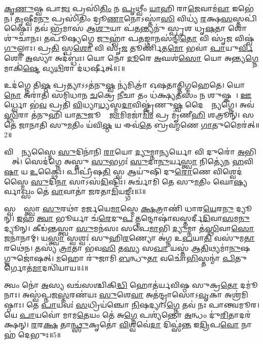 \ul{𑌕𑍃}\ul{𑌣𑍁}𑌷𑍍𑌵 𑌪𑌾\ul{𑌜𑌃} 𑌪𑍍𑌰𑌸𑌿॑\ul{𑌤𑌿𑌂} 𑌨 \ul{𑌪𑍃}𑌥𑍍𑌵𑍀𑌂 \ul{𑌯𑌾}𑌹𑌿 𑌰𑌾\ul{𑌜𑍇}𑌵𑌾𑌮॑\ul{𑌵𑌾}\ul{} 𑌇𑌭𑍇॑𑌨। \ul{𑌤𑍃}𑌷𑍍𑌵𑍀𑌮\ul{𑌨𑍁} 𑌪𑍍𑌰𑌸𑌿॑𑌤𑌿𑌂 𑌦𑍍𑌰𑍂\ul{𑌣𑌾}𑌨𑍋𑌽𑌸𑍍𑌤𑌾॑\ul{𑌸𑌿} 𑌵𑌿𑌧𑍍𑌯॑ \ul{𑌰}𑌕𑍍𑌷\ul{𑌸}𑌸𑍍𑌤𑌪𑌿॑𑌷𑍍𑌠𑍈𑌃। 𑌤𑌵॑ \ul{𑌭𑍍𑌰}𑌮𑌾𑌸॑ 𑌆\ul{𑌶𑍁}𑌯𑌾 𑌪॑\ul{𑌤}𑌨𑍍𑌤𑍍𑌯𑌨𑍁॑ 𑌸𑍍𑌪𑍃𑌶 𑌧𑍃\ul{𑌷}𑌤𑌾 𑌶𑍋𑌶𑍁॑𑌚𑌾𑌨𑌃। 𑌤𑌪𑍂॑𑌷𑍍𑌯𑌗𑍍𑌨𑍇 \ul{𑌜𑍁}𑌹𑍍𑌵𑌾॑ 𑌪\ul{𑌤}𑌙𑍍𑌗𑌾𑌨𑌸॑𑌨𑍍𑌦𑌿\ul{𑌤𑍋} 𑌵𑌿 𑌸𑍃॑\ul{𑌜} 𑌵𑌿𑌷𑍍𑌵॑\ul{𑌗𑍁}𑌲𑍍𑌕𑌾𑌃। 𑌪𑍍𑌰\ul{𑌤𑌿} 𑌸𑍍𑌪\ul{𑌶𑍋} 𑌵𑌿 𑌸𑍃॑\ul{𑌜} 𑌤𑍂𑌰𑍍𑌣𑌿॑𑌤\ul{𑌮𑍋} 𑌭𑌵𑌾॑ \ul{𑌪𑌾}𑌯𑍁\ul{𑌰𑍍𑌵𑌿}𑌶𑍋 \ul{𑌅}𑌸𑍍𑌯𑌾 𑌅𑌦॑𑌬𑍍𑌧𑌃। 𑌯𑍋 𑌨𑍋॑ \ul{𑌦𑍂}𑌰𑍇 \ul{𑌅}𑌘𑌶॑\ul{𑌸𑍋}  𑌯𑍋 𑌅𑌨𑍍𑌤𑍍𑌯\ul{𑌗𑍍𑌨𑍇} 𑌮𑌾𑌕𑌿॑\ul{𑌷𑍍𑌟𑍇} 𑌵𑍍𑌯\ul{𑌥𑌿}𑌰𑌾 𑌦॑𑌧𑌰𑍍𑌷𑍀𑌤𑍍॥1॥

𑌉𑌦॑𑌗𑍍𑌨𑍇 𑌤𑌿\ul{𑌷𑍍𑌠} 𑌪𑍍𑌰𑌤𑍍𑌯𑌾𑌽𑌽𑌤॑𑌨𑍁\ul{𑌷𑍍𑌵} 𑌨𑍍𑌯॑𑌮𑌿𑌤𑍍𑌰𑌾॑ 𑌓𑌷𑌤𑌾𑌤𑍍𑌤𑌿𑌗𑍍𑌮𑌹𑍇𑌤𑍇। 𑌯𑍋 \ul{𑌨𑍋} 𑌅𑌰𑌾॑𑌤𑌿 𑌸𑌮𑌿𑌧𑌾𑌨 \ul{𑌚}𑌕𑍍𑌰𑍇 \ul{𑌨𑍀}𑌚𑌾 𑌤𑌂 𑌧॑𑌕𑍍𑌷𑍍𑌯\ul{𑌤}𑌸𑌂 𑌨 𑌶𑍁𑌷𑍍𑌕𑌮𑍍᳚। \ul{𑌊}𑌰𑍍𑌧𑍍𑌵𑍋 𑌭॑\ul{𑌵} 𑌪𑍍𑌰𑌤𑌿॑ \ul{𑌵𑌿}𑌧𑍍𑌯𑌾\ul{𑌧𑍍𑌯}𑌸𑍍𑌮\ul{𑌦𑌾}𑌵𑌿𑌷𑍍𑌕𑍃॑𑌣𑍁\ul{𑌷𑍍𑌵} 𑌦𑍈𑌵𑍍𑌯𑌾᳚𑌨𑍍𑌯𑌗𑍍𑌨𑍇। 𑌅𑌵॑ \ul{𑌸𑍍𑌥𑌿}𑌰𑌾 𑌤॑𑌨𑍁𑌹𑌿 𑌯𑌾\ul{𑌤𑍁}𑌜𑍂𑌨𑌾𑌂᳚ \ul{𑌜𑌾}𑌮𑌿𑌮𑌜𑌾॑\ul{𑌮𑌿𑌂} 𑌪𑍍𑌰 𑌮𑍃॑𑌣𑍀\ul{𑌹𑌿} 𑌶𑌤𑍍𑌰𑍂𑌨𑍍॑। 𑌸 𑌤𑍇॑ 𑌜𑌾𑌨𑌾𑌤𑌿 𑌸𑍁\ul{𑌮}𑌤𑌿𑌂 𑌯॑𑌵𑌿\ul{𑌷𑍍𑌠} 𑌯 𑌈𑌵॑\ul{𑌤𑍇} 𑌬𑍍𑌰𑌹𑍍𑌮॑𑌣𑍇 \ul{𑌗𑌾}𑌤𑍁𑌮𑍈𑌰॑𑌤𑍍॥2॥

 𑌵𑌿𑌶𑍍𑌵𑌾᳚𑌨𑍍𑌯𑌸𑍍𑌮𑍈 \ul{𑌸𑍁}𑌦𑌿𑌨𑌾॑𑌨𑌿 \ul{𑌰𑌾}𑌯𑍋 \ul{𑌦𑍍𑌯𑍁}𑌮𑍍𑌨𑌾\ul{𑌨𑍍𑌯}𑌰𑍍𑌯𑍋 𑌵𑌿 𑌦𑍁𑌰𑍋॑ \ul{𑌅}𑌭𑌿 𑌦𑍍𑌯𑍗᳚𑌤𑍍। 𑌸𑍇𑌦॑𑌗𑍍𑌨𑍇 𑌅𑌸𑍍𑌤𑍁 \ul{𑌸𑍁}𑌭𑌗𑌃॑ \ul{𑌸𑍁}𑌦𑌾\ul{𑌨𑍁}𑌰𑍍𑌯\ul{𑌸𑍍𑌤𑍍𑌵𑌾} 𑌨𑌿𑌤𑍍𑌯𑍇॑𑌨 \ul{𑌹}𑌵𑌿\ul{𑌷𑌾} 𑌯 \ul{𑌉}𑌕𑍍𑌥𑍈𑌃। 𑌪𑌿𑌪𑍍𑌰𑍀॑𑌷\ul{𑌤𑌿} 𑌸𑍍𑌵 𑌆𑌯𑍁॑𑌷𑌿 𑌦𑍁\ul{𑌰𑍋}𑌣𑍇 𑌵𑌿𑌶𑍍𑌵𑍇𑌦॑𑌸𑍍𑌮𑍈 \ul{𑌸𑍁}𑌦𑌿\ul{𑌨𑌾} 𑌸𑌾𑌽𑌸॑\ul{𑌦𑌿}𑌷𑍍𑌟𑌿𑌃। 𑌅𑌰𑍍𑌚𑌾॑𑌮𑌿 𑌤𑍇 𑌸𑍁\ul{𑌮}𑌤𑌿𑌂 𑌘𑍋\ul{𑌷𑍍𑌯}𑌰𑍍𑌵𑌾𑌖𑍍𑌸𑌂 𑌤𑍇॑ \ul{𑌵𑌾}𑌵𑌾𑌤𑌾॑ 𑌜𑌰𑌤𑌾\ul{𑌮𑌿}𑌯𑌙𑍍𑌗𑍀𑌃॥3॥
 
𑌸𑍍𑌵𑌶𑍍𑌵𑌾᳚𑌸𑍍𑌤𑍍𑌵𑌾 \ul{𑌸𑍁}𑌰𑌥𑌾॑ 𑌮𑌰𑍍𑌜𑌯𑍇\ul{𑌮𑌾}𑌸𑍍𑌮𑍇 \ul{𑌕𑍍𑌷}𑌤𑍍𑌰𑌾𑌣𑌿॑ 𑌧𑌾𑌰\ul{𑌯𑍇}𑌰\ul{𑌨𑍁} 𑌦𑍍𑌯𑍂𑌨𑍍। \ul{𑌇}𑌹 \ul{𑌤𑍍𑌵𑌾} 𑌭𑍂𑌰𑍍𑌯𑌾 𑌚॑\ul{𑌰𑍇}𑌦𑍁\ul{𑌪} 𑌤𑍍𑌮𑌨𑍍𑌦𑍋𑌷𑌾॑\-𑌵𑌸𑍍𑌤𑌰𑍍𑌦𑍀\ul{𑌦𑌿}𑌵𑌾\-\ul{𑌸}𑌮\ul{𑌨𑍁} 𑌦𑍍𑌯𑍂𑌨𑍍। 𑌕𑍀𑌡॑𑌨𑍍𑌤𑌸𑍍𑌤𑍍𑌵𑌾 \ul{𑌸𑍁}𑌮𑌨॑𑌸𑌃 𑌸𑌪𑍇\ul{𑌮𑌾}𑌭𑌿 \ul{𑌦𑍍𑌯𑍁}𑌮𑍍𑌨𑌾 𑌤॑\ul{𑌸𑍍𑌥𑌿}𑌵𑌾\ul{𑌸𑍋} 𑌜𑌨𑌾॑𑌨𑌾𑌮𑍍। 𑌯\ul{𑌸𑍍𑌤𑍍𑌵𑌾} 𑌸𑍍𑌵𑌶𑍍𑌵𑌃॑ 𑌸𑍁𑌹𑌿\ul{𑌰}𑌣𑍍𑌯𑍋 𑌅॑𑌗𑍍𑌨 𑌉\ul{𑌪}𑌯𑌾\ul{𑌤𑌿} 𑌵𑌸𑍁॑𑌮\ul{𑌤𑌾} 𑌰𑌥𑍇॑𑌨। 𑌤𑌸𑍍𑌯॑ \ul{𑌤𑍍𑌰𑌾}𑌤𑌾 𑌭॑𑌵\ul{𑌸𑌿} 𑌤\ul{𑌸𑍍𑌯} 𑌸\ul{𑌖𑌾} 𑌯𑌸𑍍𑌤॑ 𑌆\ul{𑌤𑌿}𑌥𑍍𑌯𑌮𑌾॑\ul{𑌨𑍁}𑌷𑌗𑍍𑌜𑍁𑌜𑍋॑𑌷𑌤𑍍। \ul{𑌮}𑌹𑍋 𑌰𑍁॑𑌜𑌾𑌮𑌿 \ul{𑌬}𑌨𑍍𑌧𑍁\ul{𑌤𑌾} 𑌵𑌚𑍋॑\ul{𑌭𑌿}𑌸𑍍𑌤𑌨𑍍𑌮𑌾॑ \ul{𑌪𑌿}𑌤𑍁𑌰𑍍𑌗𑍋𑌤॑\ul{𑌮𑌾}𑌦𑌨𑍍𑌵𑌿॑𑌯𑌾𑌯॥4॥

 𑌤𑍍𑌵𑌂 𑌨𑍋॑ \ul{𑌅}𑌸𑍍𑌯 𑌵𑌚॑𑌸𑌶𑍍𑌚𑌿𑌕𑌿\ul{𑌦𑍍𑌧𑌿} 𑌹𑍋𑌤॑𑌰𑍍𑌯𑌵𑌿𑌷𑍍𑌠 𑌸𑍁𑌕𑍍𑌰\ul{𑌤𑍋} 𑌦𑌮𑍂॑𑌨𑌾𑌃। 𑌅𑌸𑍍𑌵॑𑌪𑍍𑌨𑌜\ul{𑌸𑍍𑌤}𑌰𑌣॑𑌯𑌃 \ul{𑌸𑍁}𑌶𑍇\ul{𑌵𑌾} 𑌅𑌤॑𑌨𑍍𑌦𑍍𑌰𑌾𑌸𑍋𑌽\ul{𑌵𑍃}𑌕𑌾 𑌅𑌶𑍍𑌰॑𑌮𑌿𑌷𑍍𑌠𑌾𑌃। 𑌤𑍇 \ul{𑌪𑌾}𑌯𑌵𑌃॑ \ul{𑌸}𑌧𑍍𑌰𑌿𑌯॑𑌞𑍍𑌚𑍋 \ul{𑌨𑌿}𑌷𑌦𑍍𑌯𑌾𑌽\ul{𑌗𑍍𑌨𑍇} 𑌤𑌵॑ 𑌨𑌃 𑌪𑌾𑌨𑍍𑌤𑍍𑌵𑌮𑍂𑌰। 𑌯𑍇 \ul{𑌪𑌾}𑌯𑌵𑍋॑ 𑌮𑌾𑌮\ul{𑌤𑍇}𑌯𑌂 𑌤𑍇॑ 𑌅\ul{𑌗𑍍𑌨𑍇} 𑌪𑌶𑍍𑌯॑𑌨𑍍𑌤𑍋 \ul{𑌅}𑌨𑍍𑌧𑌂 𑌦𑍁॑\ul{𑌰𑌿}𑌤𑌾𑌦𑌰॑𑌕𑍍𑌷𑌨𑍍। \ul{𑌰}𑌰\ul{𑌕𑍍𑌷} 𑌤𑌾\ul{𑌨𑍍𑌥𑍍𑌸𑍁}𑌕𑍃𑌤𑍋॑ \ul{𑌵𑌿}𑌶𑍍𑌵𑌵𑍇॑\ul{𑌦𑌾} 𑌦𑌿𑌫𑍍𑌸॑\ul{𑌨𑍍𑌤} 𑌇\ul{𑌦𑍍𑌰𑌿}𑌪\ul{𑌵𑍋} 𑌨𑌾 𑌹॑ 𑌦𑍇𑌭𑍁𑌃॥5॥
 
